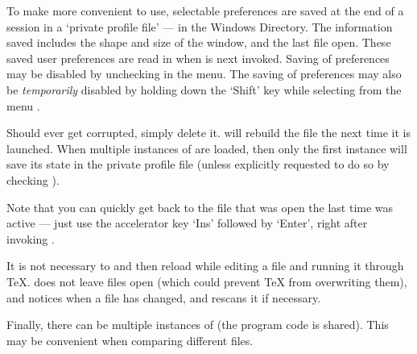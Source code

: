 

To make {\DVIWindo} more convenient to use, %
selectable preferences are saved at the end of a session in a
`private profile file' ---  in the Windows Directory.
The information saved includes the shape and size of the window,
and the last file open.
These saved user preferences are read in when {\DVIWindo} is next invoked.  
Saving of preferences may be disabled by unchecking 
 in the  menu.
The saving of preferences may also be {\it temporarily\/} disabled 
by holding down the `Shift' %
key while selecting  from the  menu%
.

Should  ever get corrupted, simply delete it.
{\DVIWindo} will rebuild the file the next time it is launched. 
%
When multiple instances of {\DVIWindo} are loaded, then only the first
instance will save its state in the private profile file
(unless explicitly requested to do so by checking ).

Note that you can quickly get back to the file that was open the last time
{\DVIWindo} was active %
--- just use the accelerator key `Ins' followed by `Enter',
right after invoking {\DVIWindo}. %

It is not necessary to  and then reload {\DVIWindo}
while editing a file and running it through {\TeX}. %
{\DVIWindo} does not %
leave files open
(which could prevent {\TeX} from overwriting them),
and {\DVIWindo} notices when a file has changed, 
and rescans it if necessary.

Finally, there can be multiple instances of {\DVIWindo} 
(the program code is shared).  
This may be convenient when comparing different {\DVI} files.


